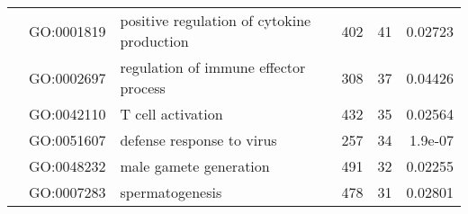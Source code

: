\documentclass[../main.tex]{subfiles}
\begin{document}
\begin{landscape}
\begin{longtable}{@{}lllccr@{}}
		                                               & GO:0001819                         & positive regulation of cytokine production                                & 402                                                                & 41                                                                   & 0.02723                                                                                  \\
		                                               & GO:0002697                         & regulation of immune effector process                                     & 308                                                                & 37                                                                   & 0.04426                                                                                  \\
		                                               & GO:0042110                         & T cell activation                                                         & 432                                                                & 35                                                                   & 0.02564                                                                                  \\
		                                               & GO:0051607                         & defense response to virus                                                 & 257                                                                & 34                                                                   & 1.9e-07                                                                                  \\
		                                               & GO:0048232                         & male gamete generation                                                    & 491                                                                & 32                                                                   & 0.02255                                                                                  \\
		                                               & GO:0007283                         & spermatogenesis                                                           & 478                                                                & 31                                                                   & 0.02801                                                                                  \\

\end{longtable}
\end{landscape}
\end{document}

